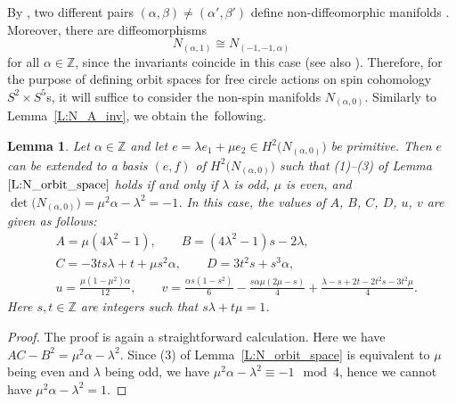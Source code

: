 \documentclass[pdftex]{sigma}
\numberwithin{equation}{section}
\newtheorem{Lemma}[Theorem]{Lemma}
\theoremstyle{definition}
\numberwithin{table}{section}
\newcommand{\Z}{\mathbb{Z}}
\begin{document}
By \cite[Proposition 4.12]{Re24b}, two different pairs $(\alpha,\beta)\neq (\alpha',\beta')$ define non-diffeomorphic manifolds . Moreover, there are diffeomorphisms
\begin{equation}\label{EQ:N_A_diff}
	N_{(\alpha,1)}\cong N_{(-1,-1,\alpha)}
\end{equation}
for all $\alpha\in\Z$, since the invariants coincide in this case (see also \cite[Lemma~4.17]{Re24b}). Therefore, for the purpose of defining orbit spaces for free circle actions on spin cohomology $S^2\times S^5$s, it will suffice to consider the non-spin manifolds $N_{(\alpha,0)}$. Similarly to Lemma~\ref{L:N_A_inv}, we obtain the~following.
\begin{Lemma}\label{L:N_ab_inv}
	Let $\alpha\in\Z$ and let $e=\lambda e_1+\mu e_2\in H^2\bigl(N_{(\alpha,0)}\bigr)$ be primitive. Then $e$ can be extended to a basis $(e,f)$ of $H^2\bigl(N_{(\alpha,0)}\bigr)$ such that {\rm (1)--(3)} of Lemma~$\ref{L:N_orbit_space}$ holds if and only if $\lambda$ is odd, $\mu$ is even, and
$\det\bigl(N_{(\alpha,0)}\bigr)=\mu^2\alpha-\lambda^2=-1$.
	In this case, the values of $A$, $B$, $C$, $D$, $u$, $v$ are given as follows:
	\begin{align*}
		&A=\mu(4\lambda^2-1),\qquad
		B=(4\lambda^2-1)s-2\lambda,\\
		&C=-3ts\lambda+t+\mu s^2\alpha,\qquad
		D=3t^2s+s^3\alpha,\\
		&u= \frac{\mu(1-\mu^2)\alpha}{12},\qquad
		v=\frac{\alpha s(1-s^2)}{6}-\frac{s\alpha\mu(2\mu-s)}{4}+\frac{\lambda-s+2t-2t^2s-3t^2\mu}{4}.
	\end{align*}
	Here $s,t\in\Z$ are integers such that $s\lambda+t\mu=1$.
\end{Lemma}
\begin{proof}
	The proof is again a straightforward calculation. Here we have $AC-B^2=\mu^2\alpha-\lambda^2$. Since (3) of Lemma~\ref{L:N_orbit_space} is equivalent to $\mu$ being even and $\lambda$ being odd, we have $\mu^2\alpha-\lambda^2\equiv -1\mod4$, hence we cannot have $\mu^2\alpha-\lambda^2=1$.
\end{proof}
\end{document}

